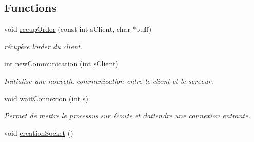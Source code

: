 \subsection*{Functions}
\begin{DoxyCompactItemize}
\item 
void \hyperlink{group__serveur_ga909ce3a76ccb623a444a43891e4445da}{recup\+Order} (const int s\+Client, char $\ast$buff)
\begin{DoxyCompactList}\small\item\em récupère l\textquotesingle{}order du client. \end{DoxyCompactList}\item 
int \hyperlink{group__serveur_gae724501fae5a588a1b1c6b44156bd67c}{new\+Communication} (int s\+Client)
\begin{DoxyCompactList}\small\item\em Initialise une nouvelle communication entre le client et le serveur. \end{DoxyCompactList}\item 
void \hyperlink{group__serveur_ga4f4149b5cd35f8764a337891365f51c0}{wait\+Connexion} (int s)
\begin{DoxyCompactList}\small\item\em Permet de mettre le processus sur écoute et d\textquotesingle{}attendre une connexion entrante. \end{DoxyCompactList}\item 
\hypertarget{group__serveur_gad1f7d60ee380c091de6e9f500eefe529}{}void \hyperlink{group__serveur_gad1f7d60ee380c091de6e9f500eefe529}{creation\+Socket} ()\label{group__serveur_gad1f7d60ee380c091de6e9f500eefe529}


\end{DoxyCompactItemize}
